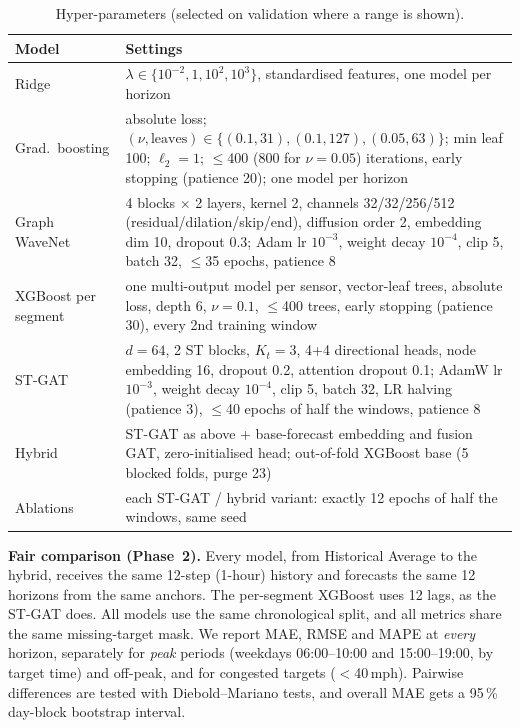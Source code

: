 \begin{table}[t]
\centering
\caption{Hyper-parameters (selected on validation where a range is shown).}
\label{tab:hparams}
\setlength{\tabcolsep}{3pt}
\begin{tabular}{p{1.9cm}p{6.1cm}}
\toprule
Model & Settings \\
\midrule
Ridge & $\lambda\in\{10^{-2},1,10^{2},10^{3}\}$, standardised features, one model per horizon \\
Grad.\ boosting & absolute loss; $(\nu,\text{leaves})\in\{(0.1,31),(0.1,127),(0.05,63)\}$; min leaf 100; $\ell_2{=}1$; $\le$400 (800 for $\nu{=}0.05$) iterations, early stopping (patience 20); one model per horizon \\
Graph WaveNet & 4 blocks $\times$ 2 layers, kernel 2, channels 32/32/256/512 (residual/dilation/skip/end), diffusion order 2, embedding dim 10, dropout 0.3; Adam lr $10^{-3}$, weight decay $10^{-4}$, clip 5, batch 32, $\le$35 epochs, patience 8 \\
XGBoost per segment & one multi-output model per sensor, vector-leaf trees, absolute loss, depth 6, $\nu{=}0.1$, $\le$400 trees, early stopping (patience 30), every 2nd training window \\
ST-GAT & $d{=}64$, 2 ST blocks, $K_t{=}3$, 4+4 directional heads, node embedding 16, dropout 0.2, attention dropout 0.1; AdamW lr $10^{-3}$, weight decay $10^{-4}$, clip 5, batch 32, LR halving (patience 3), $\le$40 epochs of half the windows, patience 8 \\
Hybrid & ST-GAT as above + base-forecast embedding and fusion GAT, zero-initialised head; out-of-fold XGBoost base (5 blocked folds, purge 23) \\
Ablations & each ST-GAT / hybrid variant: exactly 12 epochs of half the windows, same seed \\
\bottomrule
\end{tabular}
\end{table}

\textbf{Fair comparison (Phase~2).} Every model, from Historical Average to the
hybrid, receives the same 12-step (1-hour) history and forecasts the same 12
horizons from the same anchors. The per-segment XGBoost uses 12 lags, as the ST-GAT
does. All models use the same chronological split, and all metrics share the same
missing-target mask. We report MAE, RMSE and MAPE at \emph{every} horizon,
separately for \emph{peak} periods (weekdays 06:00--10:00 and 15:00--19:00, by target
time) and off-peak, and for congested targets ($<$40\,mph). Pairwise differences are
tested with Diebold--Mariano tests, and overall MAE gets a 95\,\% day-block bootstrap
interval.

